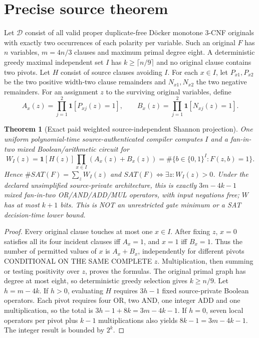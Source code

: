 \documentclass[11pt]{article}
\newtheorem{theorem}{Theorem}
\begin{document}
\section{Precise source theorem}
Let $\mathcal D$ consist of all valid proper duplicate-free D\"ocker monotone 3-CNF originals with exactly two occurrences of each polarity per variable. Such an original $F$ has $n$ variables, $m=4n/3$ clauses and maximum primal degree eight. A deterministic greedy maximal independent set $I$ has $k\ge\lceil n/9\rceil$ and no original clause contains two pivots. Let $H$ consist of source clauses avoiding $I$. For each $x\in I$, let $P_{x1},P_{x2}$ be the two positive width-two clause remainders and $N_{x1},N_{x2}$ the two negative remainders. For an assignment $z$ to the surviving original variables, define
\[
A_x(z)=\prod_{j=1}^2 \mathbf1[P_{xj}(z)=1],\qquad
B_x(z)=\prod_{j=1}^2 \mathbf1[N_{xj}(z)=1].
\]
\begin{theorem}[Exact paid weighted source-independent Shannon projection]
One uniform polynomial-time source-authenticated compiler computes $I$ and a fan-in-two mixed Boolean/arithmetic circuit for
\[
\boxed{W_I(z)=\mathbf1[H(z)]\prod_{x\in I}(A_x(z)+B_x(z))
=\#\{b\in\{0,1\}^I:F(z,b)=1\}.}
\]
Hence $\#SAT(F)=\sum_z W_I(z)$ and $SAT(F)\iff\exists z: W_I(z)>0$. Under the declared unsimplified source-private architecture, this is exactly $3m-4k-1$ mixed fan-in-two OR/AND/ADD/MUL operators, with input negations free; $W$ has at most $k+1$ bits. This is NOT an unrestricted gate minimum or a SAT decision-time lower bound.
\end{theorem}
\begin{proof}
Every original clause touches at most one $x\in I$. After fixing $z$, $x=0$ satisfies all its four incident clauses iff $A_x=1$, and $x=1$ iff $B_x=1$. Thus the number of permitted values of $x$ is $A_x+B_x$, independently for different pivots CONDITIONAL ON THE SAME COMPLETE $z$. Multiplication, then summing or testing positivity over $z$, proves the formulas. The original primal graph has degree at most eight, so deterministic greedy selection gives $k\ge n/9$. Let $h=m-4k$. If $h>0$, evaluating $H$ requires $3h-1$ fixed source-private Boolean operators. Each pivot requires four OR, two AND, one integer ADD and one multiplication, so the total is $3h-1+8k=3m-4k-1$. If $h=0$, seven local operators per pivot plus $k-1$ multiplications also yields $8k-1=3m-4k-1$. The integer result is bounded by $2^k$.
\end{proof}
\end{document}
